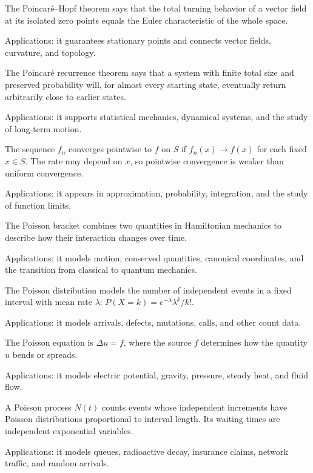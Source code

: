 The Poincaré--Hopf theorem says that the total turning behavior of a vector field at its isolated zero points equals the Euler characteristic of the whole space. \par\noindent Applications: it guarantees stationary points and connects vector fields, curvature, and topology.

The Poincaré recurrence theorem says that a system with finite total size and preserved probability will, for almost every starting state, eventually return arbitrarily close to earlier states. \par\noindent Applications: it supports statistical mechanics, dynamical systems, and the study of long-term motion.

The sequence $f_n$ converges pointwise to $f$ on $S$ if $f_n(x)\to f(x)$ for each fixed $x\in S$. The rate may depend on $x$, so pointwise convergence is weaker than uniform convergence. \par\noindent Applications: it appears in approximation, probability, integration, and the study of function limits.

The Poisson bracket combines two quantities in Hamiltonian mechanics to describe how their interaction changes over time. \par\noindent Applications: it models motion, conserved quantities, canonical coordinates, and the transition from classical to quantum mechanics.

The Poisson distribution models the number of independent events in a fixed interval with mean rate $\lambda$: $P(X=k)=e^{-\lambda}\lambda^k/k!$. \par\noindent Applications: it models arrivals, defects, mutations, calls, and other count data.

The Poisson equation is $\Delta u=f$, where the source $f$ determines how the quantity $u$ bends or spreads. \par\noindent Applications: it models electric potential, gravity, pressure, steady heat, and fluid flow.

A Poisson process $N(t)$ counts events whose independent increments have Poisson distributions proportional to interval length. Its waiting times are independent exponential variables. \par\noindent Applications: it models queues, radioactive decay, insurance claims, network traffic, and random arrivals.

